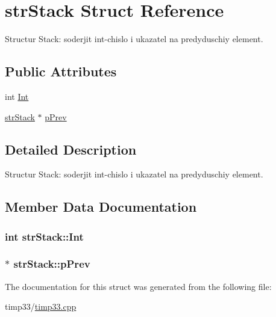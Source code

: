 \hypertarget{structstr_stack}{\section{str\-Stack \-Struct \-Reference}
\label{structstr_stack}
}


\-Structur \-Stack\-: soderjit int-\/chislo i ukazatel na predyduschiy element.  


\subsection*{\-Public \-Attributes}
\begin{DoxyCompactItemize}
\item 
int \hyperlink{structstr_stack_a1ed4f6f602ce116b53d2e3800f4ea880}{\-Int}
\item 
\hyperlink{structstr_stack}{str\-Stack} $\ast$ \hyperlink{structstr_stack_ae4a0959b54b38392275296643b581884}{p\-Prev}
\end{DoxyCompactItemize}


\subsection{\-Detailed \-Description}
\-Structur \-Stack\-: soderjit int-\/chislo i ukazatel na predyduschiy element. 

\subsection{\-Member \-Data \-Documentation}
\hypertarget{structstr_stack_a1ed4f6f602ce116b53d2e3800f4ea880}{
\subsubsection[{\-Int}]{\setlength{\rightskip}{0pt plus 5cm}int {\bf str\-Stack\-::\-Int}}}\label{structstr_stack_a1ed4f6f602ce116b53d2e3800f4ea880}
\hypertarget{structstr_stack_ae4a0959b54b38392275296643b581884}{
\subsubsection[{p\-Prev}]{$\ast$ {\bf str\-Stack\-::p\-Prev}}}\label{structstr_stack_ae4a0959b54b38392275296643b581884}


\-The documentation for this struct was generated from the following file\-:\begin{DoxyCompactItemize}
\item 
timp33/\hyperlink{timp33_8cpp}{timp33.\-cpp}\end{DoxyCompactItemize}

